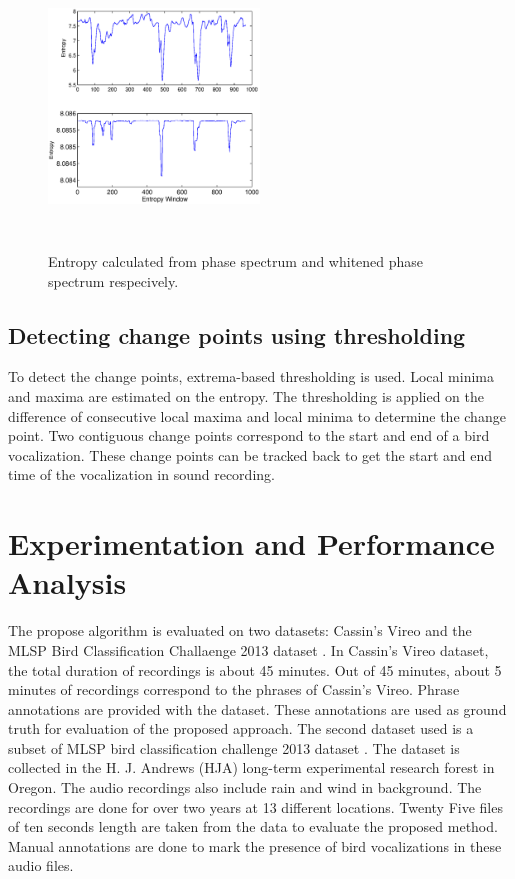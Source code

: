 \documentclass[a4paper]{article}
\begin{document}
\begin{figure}[h]
\centering
\includegraphics[width=0.5\textwidth,height=7.5cm]{Entropy_gd_white_non_white.eps}
\caption{Entropy calculated from phase spectrum and whitened phase spectrum respecively.}
\label{fig:entropy}
\end{figure}



\subsection{Detecting change points using thresholding}



   
To detect the change points, extrema-based thresholding is used. Local minima and maxima are estimated on the entropy.  The thresholding is applied on the difference of  consecutive local maxima and local minima to determine the change point.  Two contiguous change points correspond to the start and end of a bird vocalization. These change points can be tracked back to get the start and end time of the vocalization in sound recording.     
   
   
   




\section{Experimentation and Performance Analysis}
The propose algorithm is evaluated on two datasets: Cassin’s Vireo \cite{data1} and the MLSP Bird Classification Challaenge 2013 dataset \cite{data2}. In Cassin's Vireo dataset, the total duration of recordings is about 45 minutes. Out of 45 minutes, about 5 minutes of recordings correspond to the phrases of Cassin's Vireo. Phrase annotations are provided with the dataset. These annotations are used as ground truth for evaluation of the proposed approach. The second dataset used is a subset of MLSP bird classification challenge 2013 dataset \cite{data2}. The dataset is collected in the H. J. Andrews (HJA) long-term experimental research forest in Oregon. The audio recordings also include rain and wind in background. The recordings are done for over two years at 13 different locations. Twenty Five files of ten seconds length are taken from the data to evaluate the proposed method. Manual annotations are done to mark the presence of bird vocalizations in these audio files.  
\end{document}

